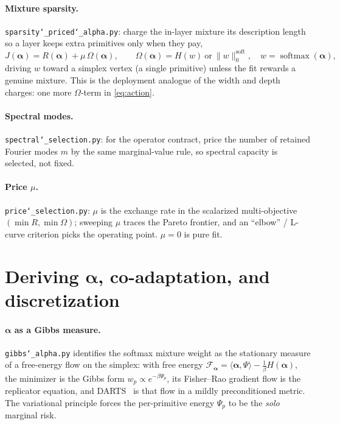\documentclass[11pt]{article}
\newcommand{\allowbreakhere}{\discretionary{}{}{}}
\newcommand{\code}[1]{\texttt{\def\_{\char`_\allowbreakhere}#1}}
\newcommand{\F}{\mathcal{F}}
\newcommand{\alphapar}{\bm{\alpha}}
\newcommand{\softmax}{\operatorname{softmax}}
\begin{document}
\paragraph{Mixture sparsity.} \code{sparsity\_priced\_alpha.py}: charge the in-layer mixture its description
length so a layer keeps extra primitives only when they pay,
\begin{equation}
\label{eq:alpha-price}
J(\alphapar)=R(\alphapar)+\mu\,\Omega(\alphapar),\qquad
\Omega(\alphapar)=H(w)\ \text{or}\ \lVert w\rVert_0^{\mathrm{soft}},\quad w=\softmax(\alphapar),
\end{equation}
driving $w$ toward a simplex vertex (a single primitive) unless the fit rewards a genuine mixture. This is
the deployment analogue of the width and depth charges: one more $\Omega$-term in \eqref{eq:action}.

\paragraph{Spectral modes.} \code{spectral\_selection.py}: for the operator contract, price the number of
retained Fourier modes $m$ by the same marginal-value rule, so spectral capacity is selected, not fixed.

\paragraph{Price $\mu$.} \code{price\_selection.py}: $\mu$ is the exchange rate in the scalarized
multi-objective $(\min R,\min\Omega)$; sweeping $\mu$ traces the Pareto frontier, and an ``elbow'' / L-curve
criterion picks the operating point. $\mu{=}0$ is pure fit.

\section{Deriving \texorpdfstring{$\alphapar$}{alpha}, co-adaptation, and discretization}
\label{sec:alpha}

\paragraph{$\alphapar$ as a Gibbs measure.} \code{gibbs\_alpha.py} identifies the softmax mixture weight as
the stationary measure of a free-energy flow on the simplex: with free energy
$\F_{\alphapar}=\langle\alphapar,\Psi\rangle-\tfrac1\beta H(\alphapar)$, the minimizer is the Gibbs form
$w_p\propto e^{-\beta\Psi_p}$, its Fisher--Rao gradient flow is the replicator equation, and DARTS~\cite{liu2019darts} is that
flow in a mildly preconditioned metric. The variational principle forces the per-primitive energy $\Psi_p$
to be the \emph{solo} marginal risk.
\end{document}

